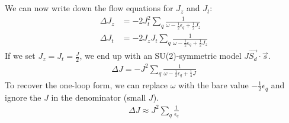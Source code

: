 \documentclass[twoside,11pt]{report}
\numberwithin{equation}{section}
\begin{document}
\\\\We can now write down the flow equations for \(J_z\) and \(J_t\):
\begin{equation}\begin{aligned}
	\Delta J_z &= - 2J_t^2 \sum_q \frac{1}{\omega - \frac{1}{2}\epsilon_q+ \frac{1}{2}J_z}\\
	\Delta J_t &= -2J_z J_t \sum_q\frac{1}{\omega - \frac{1}{2}\epsilon_q+ \frac{1}{2}J_z }
\end{aligned}\end{equation}
If we set \(J_z = J_t = \frac{J}{2}\), we end up with an SU(2)-symmetric model \(J \vec{S_d}\cdot\vec{s}\).
\begin{equation}\begin{aligned}
	\label{kondosym}
	\Delta J = - J^2 \sum_q \frac{1}{\omega - \frac{1}{2}\epsilon_q+ \frac{1}{4}J}
\end{aligned}\end{equation}
To recover the one-loop form, we can replace \(\omega\) with the bare value \(-\frac{1}{2}\epsilon_q\) and ignore the \(J\) in the denominator (small \(J\)).
\begin{equation}\begin{aligned}
	\Delta J \approx J^2 \sum_q \frac{1}{\epsilon_q}
\end{aligned}\end{equation}
\end{document}
